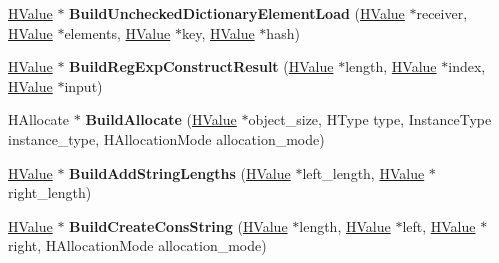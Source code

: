 \begin{DoxyCompactItemize}
\item 
\hypertarget{classv8_1_1internal_1_1_h_graph_builder_a01201a4975c1ae58c5c0bab0b460cd6c}{}\hyperlink{classv8_1_1internal_1_1_h_value}{H\+Value} $\ast$ {\bfseries Build\+Unchecked\+Dictionary\+Element\+Load} (\hyperlink{classv8_1_1internal_1_1_h_value}{H\+Value} $\ast$receiver, \hyperlink{classv8_1_1internal_1_1_h_value}{H\+Value} $\ast$elements, \hyperlink{classv8_1_1internal_1_1_h_value}{H\+Value} $\ast$key, \hyperlink{classv8_1_1internal_1_1_h_value}{H\+Value} $\ast$hash)\label{classv8_1_1internal_1_1_h_graph_builder_a01201a4975c1ae58c5c0bab0b460cd6c}

\item 
\hypertarget{classv8_1_1internal_1_1_h_graph_builder_a75be3c6b0d898152e46a0301ab37342d}{}\hyperlink{classv8_1_1internal_1_1_h_value}{H\+Value} $\ast$ {\bfseries Build\+Reg\+Exp\+Construct\+Result} (\hyperlink{classv8_1_1internal_1_1_h_value}{H\+Value} $\ast$length, \hyperlink{classv8_1_1internal_1_1_h_value}{H\+Value} $\ast$index, \hyperlink{classv8_1_1internal_1_1_h_value}{H\+Value} $\ast$input)\label{classv8_1_1internal_1_1_h_graph_builder_a75be3c6b0d898152e46a0301ab37342d}

\item 
\hypertarget{classv8_1_1internal_1_1_h_graph_builder_a64ee0a1ef120b9a1f863ae7f6f6ede4d}{}H\+Allocate $\ast$ {\bfseries Build\+Allocate} (\hyperlink{classv8_1_1internal_1_1_h_value}{H\+Value} $\ast$object\+\_\+size, H\+Type type, Instance\+Type instance\+\_\+type, H\+Allocation\+Mode allocation\+\_\+mode)\label{classv8_1_1internal_1_1_h_graph_builder_a64ee0a1ef120b9a1f863ae7f6f6ede4d}

\item 
\hypertarget{classv8_1_1internal_1_1_h_graph_builder_a3447849b5059e96a3bd9a260dbda1bb2}{}\hyperlink{classv8_1_1internal_1_1_h_value}{H\+Value} $\ast$ {\bfseries Build\+Add\+String\+Lengths} (\hyperlink{classv8_1_1internal_1_1_h_value}{H\+Value} $\ast$left\+\_\+length, \hyperlink{classv8_1_1internal_1_1_h_value}{H\+Value} $\ast$right\+\_\+length)\label{classv8_1_1internal_1_1_h_graph_builder_a3447849b5059e96a3bd9a260dbda1bb2}

\item 
\hypertarget{classv8_1_1internal_1_1_h_graph_builder_a3c3834187bd8b281f39a9722ac424d12}{}\hyperlink{classv8_1_1internal_1_1_h_value}{H\+Value} $\ast$ {\bfseries Build\+Create\+Cons\+String} (\hyperlink{classv8_1_1internal_1_1_h_value}{H\+Value} $\ast$length, \hyperlink{classv8_1_1internal_1_1_h_value}{H\+Value} $\ast$left, \hyperlink{classv8_1_1internal_1_1_h_value}{H\+Value} $\ast$right, H\+Allocation\+Mode allocation\+\_\+mode)\label{classv8_1_1internal_1_1_h_graph_builder_a3c3834187bd8b281f39a9722ac424d12}


\end{DoxyCompactItemize}
